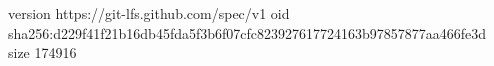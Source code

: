 version https://git-lfs.github.com/spec/v1
oid sha256:d229f41f21b16db45fda5f3b6f07cfc823927617724163b97857877aa466fe3d
size 174916
